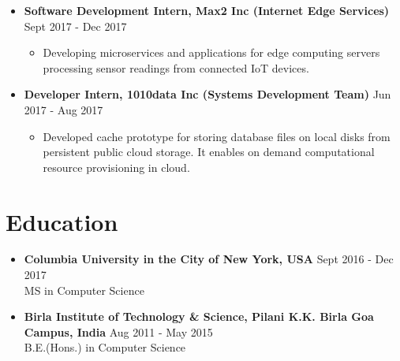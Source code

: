 \documentclass{article}
\newcommand{\bi}{\vspace{-1mm}\begin{itemize}[align=left,leftmargin=*, rightmargin=80pt, labelindent=0pt,labelsep=2pt, label={-}, nosep]}
\newcommand{\ei}{\end{itemize}}
\begin{document}
\begin{itemize}
    \item \textbf{Software Development Intern, Max2 Inc (Internet Edge Services)} {\hfill Sept 2017 - Dec 2017}
    \bi
        \item Developing microservices and applications for edge computing servers processing sensor readings from connected IoT devices.
    \ei

    \item \textbf{Developer Intern, 1010data Inc (Systems Development Team)} {\hfill Jun 2017 - Aug 2017}
    \bi
        \item Developed cache prototype for storing database files on local disks from persistent public cloud storage. It enables on demand computational resource provisioning in cloud.
    \ei
\end{itemize}

\vspace{-2mm}
\section*{Education}
\begin{itemize}
    \item \textbf{Columbia University in the City of New York, USA} {\hfill Sept 2016 - Dec 2017}\\
    MS in Computer Science
    
    \item \textbf{Birla Institute of Technology \& Science, Pilani K.K. Birla Goa Campus, India} {\hfill Aug 2011 - May 2015}\\
    B.E.(Hons.) in Computer Science
\end{itemize}


\vspace{-2mm}
\end{document}
